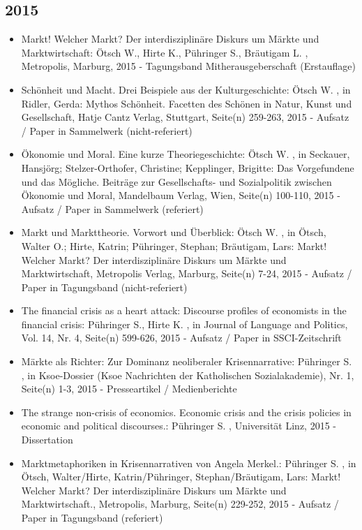  \subsection{2015} 
 \begin{itemize} 
	 \item Markt! Welcher Markt? Der interdisziplinäre Diskurs um Märkte und Marktwirtschaft: Ötsch W., Hirte K., Pühringer S., Bräutigam L. , Metropolis, Marburg, 2015 - Tagungsband Mitherausgeberschaft (Erstauflage)
	 \item Schönheit und Macht. Drei Beispiele aus der Kulturgeschichte: Ötsch W. , in Ridler, Gerda: Mythos Schönheit. Facetten des Schönen in Natur, Kunst und Gesellschaft, Hatje Cantz Verlag, Stuttgart, Seite(n) 259-263, 2015 - Aufsatz / Paper in Sammelwerk (nicht-referiert)
	 \item Ökonomie und Moral. Eine kurze Theoriegeschichte: Ötsch W. , in Seckauer, Hansjörg; Stelzer-Orthofer, Christine; Kepplinger, Brigitte: Das Vorgefundene und das Mögliche. Beiträge zur Gesellschafts- und Sozialpolitik zwischen Ökonomie und Moral, Mandelbaum Verlag, Wien, Seite(n) 100-110, 2015 - Aufsatz / Paper in Sammelwerk (referiert)
	 \item Markt und Markttheorie. Vorwort und Überblick: Ötsch W. , in Ötsch, Walter O.; Hirte, Katrin; Pühringer, Stephan; Bräutigam, Lars: Markt! Welcher Markt? Der interdisziplinäre Diskurs um Märkte und Marktwirtschaft, Metropolis Verlag, Marburg, Seite(n) 7-24, 2015 - Aufsatz / Paper in Tagungsband (nicht-referiert)
	 \item The financial crisis as a heart attack: Discourse profiles of economists in the financial crisis: Pühringer S., Hirte K. , in Journal of Language and Politics, Vol. 14, Nr. 4, Seite(n) 599-626, 2015 - Aufsatz / Paper in SSCI-Zeitschrift
	 \item Märkte als Richter: Zur Dominanz neoliberaler Krisennarrative: Pühringer S. , in Ksoe-Dossier (Ksoe Nachrichten der Katholischen Sozialakademie), Nr. 1, Seite(n) 1-3, 2015 - Presseartikel / Medienberichte
	 \item The strange non-crisis of economics. Economic crisis and the crisis policies in economic and political discourses.: Pühringer S. , Universität Linz, 2015 - Dissertation
	 \item Marktmetaphoriken in Krisennarrativen von Angela Merkel.: Pühringer S. , in Ötsch, Walter/Hirte, Katrin/Pühringer, Stephan/Bräutigam, Lars: Markt! Welcher Markt? Der interdisziplinäre Diskurs um Märkte und Marktwirtschaft., Metropolis, Marburg, Seite(n) 229-252, 2015 - Aufsatz / Paper in Tagungsband (referiert)

\end{itemize}
